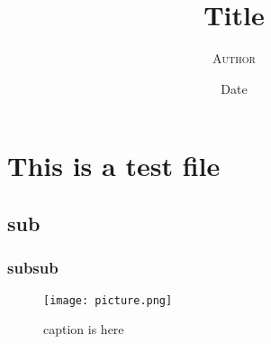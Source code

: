 \documentclass{article}
\begin{document}
\title{\textbf{Title}}
\author{\textsc{Author}}
\date{Date}
\maketitle

\section*{This is a test file}
\subsection*{sub}
\subsubsection*{subsub}
\begin{figure}[H]
  \begin{center}
    \texttt{[image: picture.png]}
    \caption{caption is here}
    \label{label}
  \end{center}
\end{figure}
\end{document}
